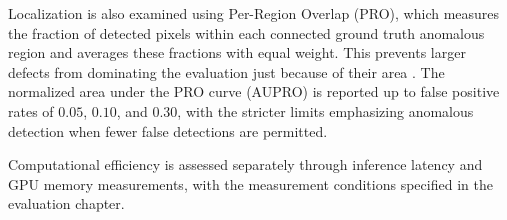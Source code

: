 Localization is also examined using Per-Region Overlap (PRO), which measures the fraction of detected pixels within each connected ground truth anomalous region and averages these fractions with equal weight. This prevents larger defects from dominating the evaluation just because of their area \cite{bergmann2021mvtec}. The normalized area under the PRO curve (AUPRO) is reported up to false positive rates of \(0.05\), \(0.10\), and \(0.30\), with the stricter limits emphasizing anomalous detection when fewer false detections are permitted.

Computational efficiency is assessed separately through inference latency and GPU memory measurements, with the measurement conditions specified in the evaluation chapter.
